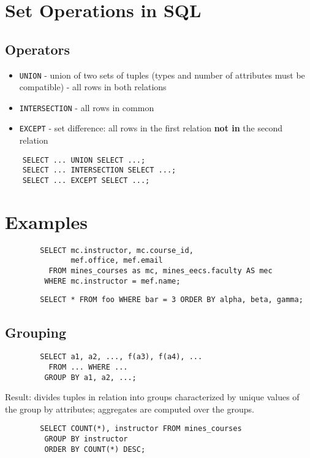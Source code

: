 \documentclass{../cheatsheet}
\begin{document}
\begin{multicols*}{2}
    \section{Set Operations in SQL}
    \subsection{Operators}
    \begin{itemize}
        \item \texttt{UNION} - union of two sets of tuples (types and number of
            attributes must be compatible) - all rows in both relations
        \item \texttt{INTERSECTION} - all rows in common
        \item \texttt{EXCEPT} - set difference: all rows in the first relation
            \textbf{not in} the second relation
    \end{itemize}

    \begin{verbatim}
    SELECT ... UNION SELECT ...;
    SELECT ... INTERSECTION SELECT ...;
    SELECT ... EXCEPT SELECT ...;
    \end{verbatim}

    \section{Examples}
    \begin{verbatim}
        SELECT mc.instructor, mc.course_id,
               mef.office, mef.email
          FROM mines_courses as mc, mines_eecs.faculty AS mec
         WHERE mc.instructor = mef.name;
    \end{verbatim}

    \begin{verbatim}
        SELECT * FROM foo WHERE bar = 3 ORDER BY alpha, beta, gamma;
    \end{verbatim}

    \subsection{Grouping}
    \begin{verbatim}
        SELECT a1, a2, ..., f(a3), f(a4), ...
          FROM ... WHERE ...
         GROUP BY a1, a2, ...;
    \end{verbatim}

    Result: divides tuples in relation into groups characterized by unique values of
    the group by attributes; aggregates are computed over the groups.

    \begin{verbatim}
        SELECT COUNT(*), instructor FROM mines_courses
         GROUP BY instructor
         ORDER BY COUNT(*) DESC;
    \end{verbatim}
\end{multicols*}
\end{document}
